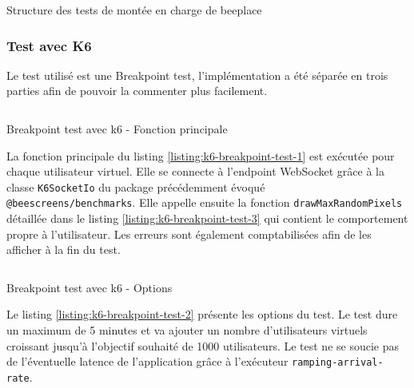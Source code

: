\begin{listing}[H]
  \begin{tcolorbox}[arc=0mm,colback=white!5!white]
  \end{tcolorbox}
  \caption{Structure des tests de montée en charge de \gls{beeplace}
    \label{listing:load-tests-structure}}
\end{listing}

\subsubsection{Test avec K6}

Le test utilisé est une Breakpoint test, l'implémentation a été séparée en trois parties afin de pouvoir la commenter plus facilement.

\begin{listing}[H]
  \inputminted[linenos]{ts}{assets/figures/breakpoint-test-1.ts}
  \caption{Breakpoint test avec k6 - Fonction principale}
  \label{listing:k6-breakpoint-test-1}
\end{listing}

La fonction principale du listing \ref{listing:k6-breakpoint-test-1} est exécutée pour chaque utilisateur virtuel. Elle se connecte à l'endpoint WebSocket grâce à la classe \texttt{K6SocketIo} du package précédemment évoqué \texttt{\\@beescreens/benchmarks}. Elle appelle ensuite la fonction \texttt{drawMaxRandomPixels} détaillée dans le listing \ref{listing:k6-breakpoint-test-3} qui contient le comportement propre à l'utilisateur. Les erreurs sont également comptabilisées afin de les afficher à la fin du test.

\begin{listing}[H]
  \inputminted[linenos]{ts}{assets/figures/breakpoint-test-2.ts}
  \caption{Breakpoint test avec k6 - Options}
  \label{listing:k6-breakpoint-test-2}
\end{listing}

Le listing \ref{listing:k6-breakpoint-test-2} présente les options du test. Le test dure un maximum de 5 minutes et va ajouter un nombre d'utilisateurs virtuels croissant jusqu'à l'objectif souhaité de 1000 utilisateurs. Le test ne se soucie pas de l'éventuelle latence de l'application grâce à l'exécuteur \texttt{ramping-arrival-rate}.

